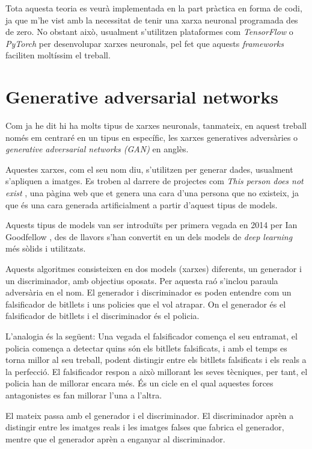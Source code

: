Tota aquesta teoria es veurà implementada en la part pràctica en forma de codi, ja que m'he vist amb la necessitat de tenir una xarxa neuronal programada des de zero. No obstant això, usualment s'utilitzen plataformes com \textit{TensorFlow} \cite{tensorflow2015-whitepaper} o \textit{PyTorch} \cite{pytorch_2019} per desenvolupar xarxes neuronals, pel fet que aquests \textit{frameworks} faciliten moltíssim el treball. 

\section{Generative adversarial networks}
Com ja he dit hi ha molts tipus de xarxes neuronals, tanmateix, en aquest treball només em centraré en un tipus en específic, les xarxes generatives adversàries o \textit{generative adversarial networks (GAN)} en anglès.

Aquestes xarxes, com el seu nom diu, s'utilitzen per generar dades, usualment s'apliquen a imatges. Es troben al darrere de projectes com \textit{This person does not exist} \cite{styleGAN, this_person_does_not_exist}, una pàgina web que et genera una cara d'una persona que no existeix, ja que és una cara generada artificialment a partir d'aquest tipus de models.

Aquests tipus de models van ser introduïts per primera vegada en 2014 per Ian Goodfellow \cite{GAN2014}, des de llavors s'han convertit en un dels models de \textit{deep learning} més sòlids i utilitzats.

Aquests algoritmes consisteixen en dos models (xarxes) diferents, un generador i un discriminador, amb objectius oposats. Per aquesta raó s'inclou paraula adversària en el nom. El generador i discriminador es poden entendre com un falsificador de bitllets i uns policies que el vol atrapar. On el generador és el falsificador de bitllets i el discriminador és el policia.

L'analogia és la següent: 
Una vegada el falsificador comença el seu entramat, el policia comença a detectar quins són els bitllets falsificats, i amb el temps es torna millor al seu treball, podent distingir entre els bitllets falsificats i els reals a la perfecció. El falsificador respon a això millorant les seves tècniques, per tant, el policia han de millorar encara més. És un cicle en el qual aquestes forces antagonistes es fan millorar l'una a l'altra.

El mateix passa amb el generador i el discriminador. El discriminador aprèn a distingir entre les imatges reals i les imatges falses que fabrica el generador, mentre que el generador aprèn a enganyar al discriminador. 

